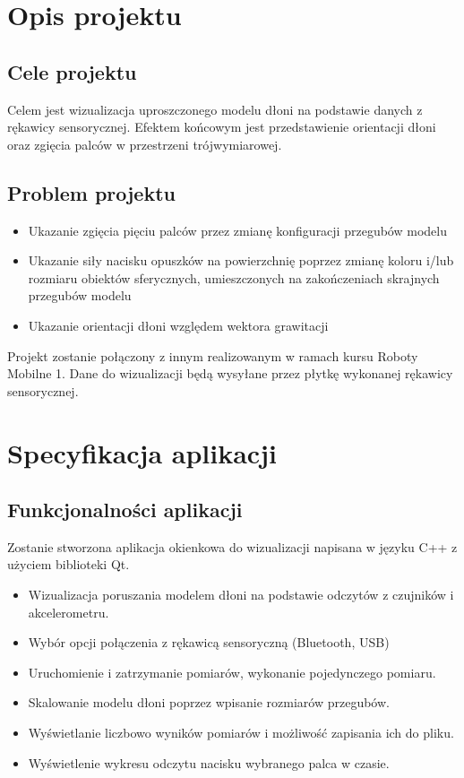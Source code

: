 \documentclass[12pt,a4paper]{article}
\begin{document}
\section{Opis projektu} \normalsize
\subsection{Cele projektu}
Celem jest wizualizacja uproszczonego modelu dłoni na podstawie danych z rękawicy sensorycznej. 
Efektem końcowym jest przedstawienie orientacji dłoni oraz zgięcia palców w przestrzeni trójwymiarowej. \\

\subsection{Problem projektu}
\begin{itemize}
\item Ukazanie zgięcia pięciu palców przez zmianę konfiguracji przegubów modelu
\item Ukazanie siły nacisku opuszków na powierzchnię poprzez zmianę koloru i/lub rozmiaru obiektów sferycznych, umieszczonych na zakończeniach skrajnych przegubów modelu
\item Ukazanie orientacji dłoni względem wektora grawitacji
\end{itemize}

Projekt zostanie połączony z innym realizowanym w ramach kursu Roboty Mobilne 1. Dane do wizualizacji będą wysyłane przez płytkę wykonanej rękawicy sensorycznej.

\section{Specyfikacja aplikacji}

\subsection{Funkcjonalności aplikacji}
Zostanie stworzona aplikacja okienkowa do wizualizacji napisana w języku C++ z użyciem biblioteki Qt.\\
\begin{itemize}
\item Wizualizacja poruszania modelem dłoni na podstawie odczytów z czujników i akcelerometru.
\item Wybór opcji połączenia z rękawicą sensoryczną (Bluetooth, USB)
\item Uruchomienie i zatrzymanie pomiarów, wykonanie pojedynczego pomiaru.
\item Skalowanie modelu dłoni poprzez wpisanie rozmiarów przegubów.
\item Wyświetlanie liczbowo wyników pomiarów i możliwość zapisania ich do pliku.
\item Wyświetlenie wykresu odczytu nacisku wybranego palca w czasie.
\end{itemize}
\end{document}
